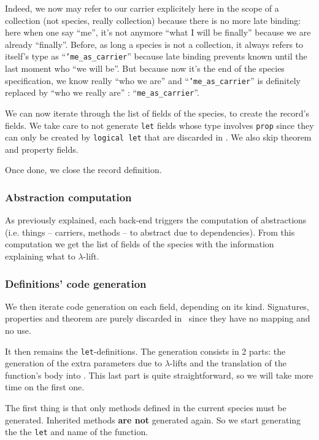 Indeed, we now may refer to our carrier explicitely here in the scope
of a collection (not species, really collection)  because there is no
more late binding: here when one say ``me'', it's not anymore ``what I
will be finally'' because we are already ``finally''. Before, as long
a species is not a collection, it always refers to itself's type as
``{\tt 'me\_as\_carrier}'' because late binding prevents known until
the last moment who ``we will be''. But because now it's the end of
the species specification, we know really ``who we are'' and
``{\tt 'me\_as\_carrier}'' is definitely replaced by ``who we really
are'' : ``{\tt me\_as\_carrier}''.

We can now iterate through the list of fields of the species, to
create the record's fields. We take care to not generate {\tt let}
fields whose type involves {\tt prop} since they can only be created
by {\tt logical let} that are discarded in \ocaml. We also skip
theorem and property fields.

\medskip
Once done, we close the record definition.


\subsubsection{Abstraction computation}
As previously explained, each back-end triggers the computation of
abstractions (i.e. things -- carriers, methods -- to abstract due to
dependencies). From this computation we get the list of fields of the
species with the information explaining what to $\lambda$-lift.


\subsubsection{Definitions' code generation}
We then iterate code generation on each field, depending on its kind.
Signatures, properties and theorem are purely discarded in \ocaml\
since they have no mapping and no use.

It then remains the {\tt let}-definitions. The generation consists in
2 parts: the generation of the extra parameters due to $\lambda$-lifts
and the translation of the function's body into \ocaml. This last part
is quite straightforward, so we will take more time on the first one.

The first thing is that only methods defined in the current species
must be generated. Inherited methods {\bf are not} generated again.
So we start generating the the {\tt let} and name of the
function.

